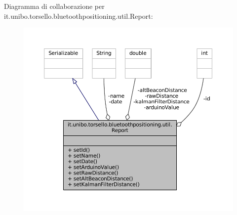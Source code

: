 Diagramma di collaborazione per it.\+unibo.\+torsello.\+bluetoothpositioning.\+util.\+Report\+:
\nopagebreak
\begin{figure}[H]
\begin{center}
\leavevmode
\includegraphics[width=350pt]{classit_1_1unibo_1_1torsello_1_1bluetoothpositioning_1_1util_1_1Report__coll__graph}
\end{center}
\end{figure}
